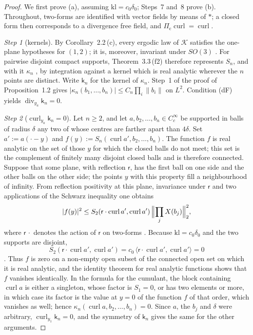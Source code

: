 \documentclass[11pt]{amsart}
\theoremstyle{definition}
\begin{document}
\begin{proof}
We first prove (a), assuming $\mathrm{kl}=c_0\delta_0$; Steps~7 and~8 prove (b).
Throughout, two-forms are identified with vector fields by means of $\ast$; a closed form then corresponds to a divergence free field, and $\Pi_{\mathrm c}\operatorname{curl}=\operatorname{curl}$.

\emph{Step 1} (kernels).
By Corollary~2.2\,(c), every ergodic law of $\mathcal K$ satisfies the one-plane hypotheses for $(1,2)$; it is, moreover, invariant under $SO(3)$ \cite[Theorem~1.4, Part~I\,(a), (f)]{QEDII}.
For pairwise disjoint compact supports, Theorem~3.3\,(f2) therefore represents $S_n$, and with it $\kappa_n$ \cite[(n5)]{QEDIII}, by integration against a kernel which is real analytic wherever the $n$ points are distinct.
Write $\mathsf k_n$ for the kernel of $\kappa_n$.
Step~1 of the proof of Proposition~1.2 gives $|\kappa_n(b_1,\dots,b_n)|\le C_n\prod_i\|b_i\|$ on $L^2$.
Condition (dF) yields $\operatorname{div}_{y_a}\mathsf k_n=0$.

\emph{Step 2} ($\operatorname{curl}_{y_a}\mathsf k_n=0$).
Let $n\ge2$, and let $a,b_2,\dots,b_n\in C_c^\infty$ be supported in balls of radius $\delta$ any two of whose centres are farther apart than $4\delta$.
Set $a':=a(\cdot-y)$ and $f(y):=S_n(\operatorname{curl}a',b_2,\dots,b_n)$.
The function $f$ is real analytic on the set of those $y$ for which the closed balls do not meet; this set is the complement of finitely many disjoint closed balls and is therefore connected.
Suppose that some plane, with reflection $\mathsf r$, has the first ball on one side and the other balls on the other side; the points $y$ with this property fill a neighbourhood of infinity.
From reflection positivity at this plane, invariance under $\mathsf r$ \cite[Theorem~1.4, Part~I\,(b), (f)]{QEDII} and two applications of the Schwarz inequality one obtains
\begin{equation*}
|f(y)|^2\le S_2(\mathsf r\cdot\operatorname{curl}a',\operatorname{curl}a')\,\Bigl\|\prod_jX(b_j)\Bigr\|_2^2,
\end{equation*}
where $\mathsf r\,\cdot$ denotes the action of $\mathsf r$ on two-forms \cite[Section~1.2]{QEDII}.
Because $\mathrm{kl}=c_0\delta_0$ and the two supports are disjoint,
\begin{equation*}
S_2(\mathsf r\cdot\operatorname{curl}a',\operatorname{curl}a')=c_0\,\langle\mathsf r\cdot\operatorname{curl}a',\operatorname{curl}a'\rangle=0
\end{equation*}
\cite[Theorem~1.4, Part~I\,(d), (f)]{QEDII}.
Thus $f$ is zero on a non-empty open subset of the connected open set on which it is real analytic, and the identity theorem for real analytic functions \cite[Lemma~14.10\,(b)]{QEDII} shows that $f$ vanishes identically.
In the formula for the cumulant, the block containing $\operatorname{curl}a$ is either a singleton, whose factor is $S_1=0$, or has two elements or more, in which case its factor is the value at $y=0$ of the function $f$ of that order, which vanishes as well; hence $\kappa_n(\operatorname{curl}a,b_2,\dots,b_n)=0$.
Since $a$, the $b_j$ and $\delta$ were arbitrary, $\operatorname{curl}_{y_1}\mathsf k_n=0$, and the symmetry of $\mathsf k_n$ gives the same for the other arguments.


\end{proof}
\end{document}
